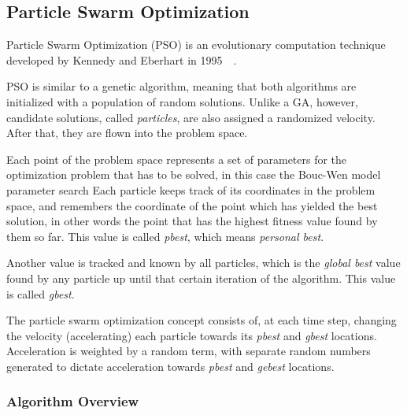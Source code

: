 \subsection{Particle Swarm Optimization}
\label{sec:5.pso}

Particle Swarm Optimization (PSO) is an evolutionary computation technique
developed by Kennedy and Eberhart in 1995~\cite{kennedy2011particle}~\cite{eberhart1995new}.

PSO is similar to a genetic algorithm, meaning that both algorithms 
are initialized with a population of random solutions. Unlike a GA, however,
candidate solutions, called \textit{particles}, are also assigned a randomized velocity.
After that, they are flown into the problem space.

Each point of the problem space represents a set of parameters for the optimization
problem that has to be solved, in this case the Bouc-Wen model parameter search
Each particle keeps track of its coordinates in the problem space,
and remembers the coordinate of the point which has yielded the best solution,
in other words the point that has the highest fitness value found by them so far.
This value is called \textit{pbest}, which means \textit{personal best}.

Another value is tracked and known by all particles, which is the \textit{global best}
value found by any particle up until that certain iteration of the algorithm.
This value is called \textit{gbest}.

The particle swarm optimization concept consists of, at each time step,
changing the velocity (accelerating) each particle towards its \textit{pbest}
and \textit{gbest} locations. Acceleration is weighted by a random term,
with separate random numbers generated to dictate acceleration towards
\textit{pbest} and \textit{gebest} locations.

\subsubsection{Algorithm Overview}

